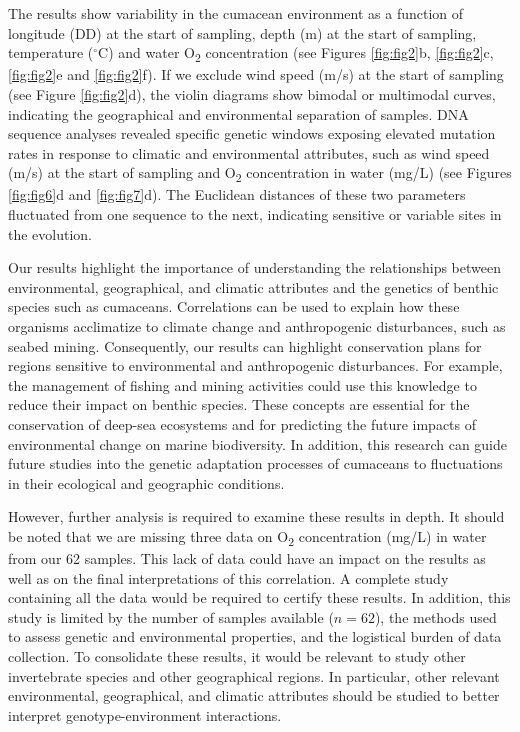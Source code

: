 The results show variability in the cumacean environment as a function of longitude (DD) at the start of sampling, depth (m) at the start of sampling, temperature ($^\circ$C) and water O\textsubscript{2} concentration (see Figures \ref{fig:fig2}b, \ref{fig:fig2}c, \ref{fig:fig2}e and \ref{fig:fig2}f). If we exclude wind speed (m/s) at the start of sampling (see Figure \ref{fig:fig2}d), the violin diagrams show bimodal or multimodal curves, indicating the geographical and environmental separation of samples. DNA sequence analyses revealed specific genetic windows exposing elevated mutation rates in response to climatic and environmental attributes, such as wind speed (m/s) at the start of sampling and O\textsubscript{2} concentration in water (mg/L) (see Figures \ref{fig:fig6}d and \ref{fig:fig7}d). The Euclidean distances of these two parameters fluctuated from one sequence to the next, indicating sensitive or variable sites in the evolution.

Our results highlight the importance of understanding the relationships between environmental, geographical, and climatic attributes and the genetics of benthic species such as cumaceans. Correlations can be used to explain how these organisms acclimatize to climate change and anthropogenic disturbances, such as seabed mining. Consequently, our results can highlight conservation plans for regions sensitive to environmental and anthropogenic disturbances. For example, the management of fishing and mining activities could use this knowledge to reduce their impact on benthic species. These concepts are essential for the conservation of deep-sea ecosystems and for predicting the future impacts of environmental change on marine biodiversity. In addition, this research can guide future studies into the genetic adaptation processes of cumaceans to fluctuations in their ecological and geographic conditions.

However, further analysis is required to examine these results in depth. It should be noted that we are missing three data on O\textsubscript{2} concentration (mg/L) in water from our 62 samples. This lack of data could have an impact on the results as well as on the final interpretations of this correlation. A complete study containing all the data would be required to certify these results. In addition, this study is limited by the number of samples available ($n=62$), the methods used to assess genetic and environmental properties, and the logistical burden of data collection. To consolidate these results, it would be relevant to study other invertebrate species and other geographical regions. In particular, other relevant environmental, geographical, and climatic attributes should be studied to better interpret genotype-environment interactions.

